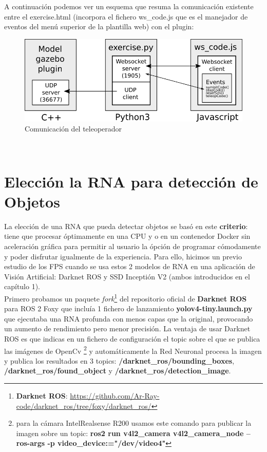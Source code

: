 A continuación podemos ver un esquema que resuma la comunicación existente entre el exercise.html (incorpora el fichero ws\_code.js que es el manejador de eventos del menú superior de la plantilla web) con el plugin:\\

\begin{figure} [H]
  \begin{center}
    \includegraphics[width=15cm]{imagenes/comunicacion-teleoperador.png}
  \end{center}
  \caption[Comunicación del teleoperador]{Comunicación del teleoperador}
  \label{fig:comunicacion_teleoperador}
\end{figure}\

\cleardoublepage


\section{Elección la RNA para detección de Objetos}
\label{sec:eleccion_rna}

La elección de una RNA que pueda detectar objetos se basó en este \textbf{criterio}: tiene que procesar óptimamente en una CPU y o en un contenedor Docker sin aceleración gráfica para permitir al usuario la ópción de programar cómodamente y poder disfrutar igualmente de la experiencia. Para ello, hicimos un previo estudio de los FPS cuando se usa estos 2 modelos de RNA en una aplicación de Visión Artificial: Darknet ROS y SSD Inceptión V2 (ambos introducidos en el capítulo 1).\\

Primero probamos un paquete \textit{fork}\footnote{\textbf{Darknet ROS}: \url{https://github.com/Ar-Ray-code/darknet_ros/tree/foxy/darknet_ros/}} del repositorio oficial de \textbf{Darknet ROS} para ROS 2 Foxy que incluía 1 fichero de lanzamiento \textbf{yolov4-tiny.launch.py} que ejecutaba una RNA profunda con menos capas que la original, provocando un aumento de rendimiento pero menor precisión. La ventaja de usar Darknet ROS es que indicas en un fichero de configuración el topic sobre el que se publica las imágenes de OpenCv \footnote{para la cámara IntelRealsense R200 usamos este comando para publicar la imagen sobre un topic: \textbf{ros2 run v4l2\_camera v4l2\_camera\_node --ros-args -p video\_device:="/dev/video4"}} y automáticamente la Red Neuronal procesa la imagen y publica los resultados en 3 topics: \textbf{/darknet\_ros/bounding\_boxes}, \textbf{/darknet\_ros/found\_object} y \textbf{/darknet\_ros/detection\_image}.\\

